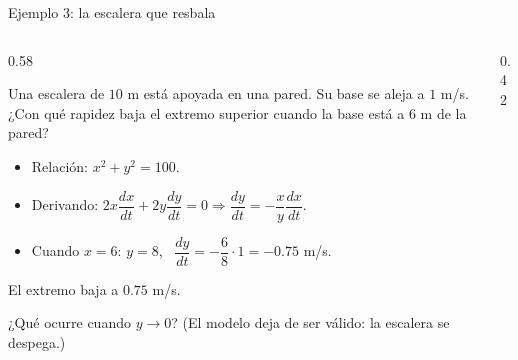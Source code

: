 \documentclass[10pt,aspectratio=169]{beamer}
\begin{document}
\begin{frame}{Ejemplo 3: la escalera que resbala}
  \begin{columns}
    \begin{column}{0.58\textwidth}
      \begin{ejemplo}
        Una escalera de $10$ m está apoyada en una pared. Su base se aleja a $1$ m/s. ¿Con qué rapidez baja el extremo superior cuando la base está a $6$ m de la pared?
        \begin{itemize}
          \item Relación: $x^2+y^2=100$.
          \item Derivando: $2x\dfrac{dx}{dt}+2y\dfrac{dy}{dt}=0\Rightarrow\dfrac{dy}{dt}=-\dfrac xy\dfrac{dx}{dt}$.
          \item Cuando $x=6$: $y=8$, \ $\dfrac{dy}{dt}=-\dfrac68\cdot1=-0.75$ m/s.
        \end{itemize}
        El extremo baja a $0.75$ m/s.
      \end{ejemplo}
      \small ¿Qué ocurre cuando $y\to0$? (El modelo deja de ser válido: la escalera se despega.)
    \end{column}
    \begin{column}{0.42\textwidth}
      \centering
    \end{column}
  \end{columns}
\end{frame}
\end{document}
